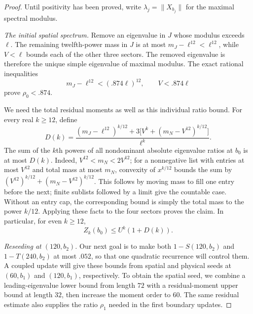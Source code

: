 \documentclass[11pt]{article}
\theoremstyle{remark}
\numberwithin{equation}{section}
\begin{document}
\begin{proof}
Until positivity has been proved, write $\lambda_j=\|X_{b_j}\|$ for
the maximal spectral modulus.

\emph{The initial spatial spectrum.}
Remove an eigenvalue in $J$ whose modulus exceeds $\ell$.
The remaining twelfth-power mass in $J$ is at most
$m_J-\ell^{12}<\ell^{12}$, while $V<\ell$ bounds each of the other
three sectors.  The removed eigenvalue is therefore the unique simple
eigenvalue of maximal modulus.  The exact rational inequalities
\[
 m_J-\ell^{12}<(.874\ell)^{12},\qquad V<.874\ell
\]
prove $\rho_0<.874$.

We need the total residual moments as well as this individual ratio
bound.  For every real $k\ge12$, define
\begin{equation}\label{per:D}
 D(k)=\frac{(m_J-\ell^{12})^{k/12}
       +3\bigl[V^k+(m_N-V^{12})^{k/12}\bigr]}{\ell^k}.
\end{equation}
The sum of the $k$th powers of all nondominant absolute eigenvalue
ratios at $b_0$ is at most $D(k)$.  Indeed,
$V^{12}<m_N<2V^{12}$; for a nonnegative list with entries at most
$V^{12}$ and total mass at most $m_N$, convexity of $x^{k/12}$ bounds
the sum by $(V^{12})^{k/12}+(m_N-V^{12})^{k/12}$.  This follows by
moving mass to fill one entry before the next; finite sublists followed
by a limit give the countable case.  Without an entry cap, the
corresponding bound is simply the total mass to the power $k/12$.
Applying these facts to the four sectors proves the claim.  In
particular, for even $k\ge12$,
\begin{equation}\label{per:Z-initial}
 Z_k(b_0)\le U^k(1+D(k)).
\end{equation}

\emph{Reseeding at $(120,b_2)$.}
Our next goal is to make both $1-S(120,b_2)$ and $1-T(240,b_2)$
at most $.052$, so that one quadratic recurrence will control them.
A coupled update will give these bounds from spatial and physical
seeds at $(60,b_1)$ and $(120,b_1)$, respectively. To obtain the
spatial seed, we combine a leading-eigenvalue lower bound from length
$72$ with a residual-moment upper bound at length $32$, then increase
the moment order to $60$. The same residual estimate also supplies
the ratio $\rho_1$ needed in the first boundary updates.


\end{proof}
\end{document}
